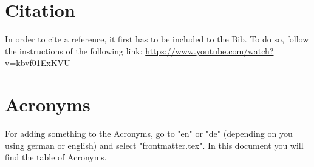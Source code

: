 \section{Citation}

In order to cite a reference, it first has to be included to the Bib. To do so, follow the instructions of the following link: \url{https://www.youtube.com/watch?v=kbvf01ExKVU}


\section{Acronyms}

For adding something to the Acronyms, go to "en" or "de" (depending on you using german or english) and select "frontmatter.tex". In this document you will find the table of Acronyms.
